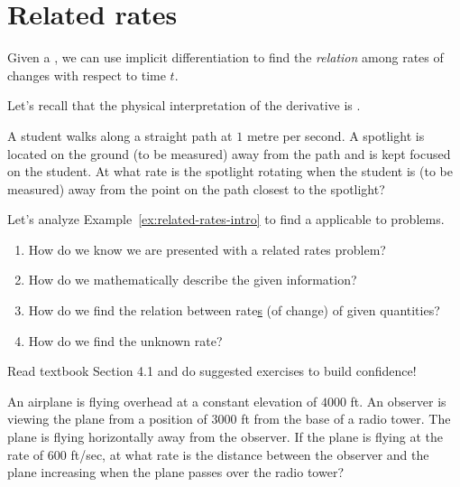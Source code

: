 \documentclass[../main.tex]{subfiles}
\begin{document}
 \section{Related rates}
  Given a , we can use implicit differentiation  to find the \emph{relation} among rates of changes with respect to time \(t\).

  Let's recall that the physical interpretation of the derivative is .
  \begin{example} \label{ex:related-rates-intro}
    A student walks along a straight path at \(1\) metre per second.  A spotlight is located on the ground (to be measured) \underline{\hspace{1in}} away from the path and is kept focused on the student. At what rate is the spotlight rotating when the student is (to be measured) \underline{\hspace{1in}} away from the point on the path closest to the spotlight?
  \end{example}

  Let's analyze Example~\ref{ex:related-rates-intro} to find a  applicable to   problems. 
  \begin{enumerate}
    \item How do we know we are presented with a related rates problem?

    \item How do we mathematically describe the given information?

    \item How do we find the relation between rate\underline{s} (of change) of given quantities?

    \item How do we find the unknown rate?
  \end{enumerate}

  \faStar{} Read textbook Section 4.1 and do suggested exercises to build confidence!

  \clearpage
  \begin{example}
    An airplane is flying overhead at a constant elevation of \(4000\) ft. An observer is viewing the plane from a position of \(3000\) ft from the base of a radio tower. The plane is flying horizontally away from the observer. If the plane is flying at the rate of \(600\) ft/sec, at what rate is the distance between the observer and the plane increasing when the plane passes over the radio tower?

  \end{example}
  \clearpage
\end{document}
